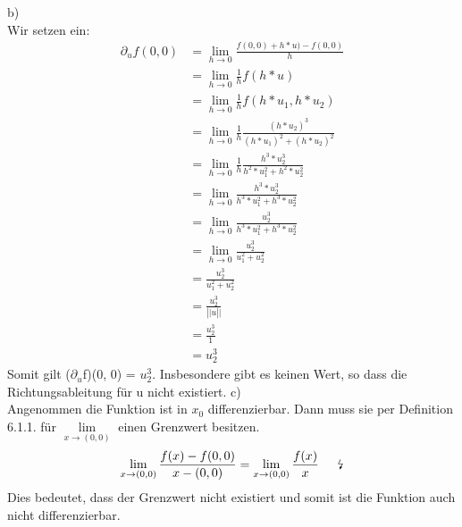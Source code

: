 \documentclass{article}
\begin{document}
\bigskip
\noindent b) \\ 
Wir setzen ein:
\begin{align*}
    \partial_u f(0, 0) &= \lim\limits_{h \to 0} \frac{f(0, 0) + h* u) - f(0, 0)}{h} \\ 
                       &= \lim\limits_{h \to 0} \frac{1}{h} f(h * u) \\ 
                       &= \lim\limits_{h \to 0} \frac{1}{h} f(h * u_1, h * u_2) \\ 
                        &= \lim\limits_{h \to 0} \frac{1}{h} \frac{(h * u_2)^3}{(h * u_1)^2 + (h * u_2)^2} \\ 
                        &= \lim\limits_{h \to 0} \frac{1}{h} \frac{h^3 * u_2^3}{h^2 * u_1^2 + h^2 * u_2^2} \\ 
                        &= \lim\limits_{h \to 0} \frac{h^3 * u_2^3}{h^3 * u_1^2 + h^3 * u_2^2} \\ 
                        &= \lim\limits_{h \to 0} \frac{u_2^3}{h^3 * u_1^2 + h^3 * u_2^2} \\ 
                        &= \lim\limits_{h \to 0} \frac{u_2^3}{u_1^2 + u_2^2} \\ 
                        &= \frac{u_2^3}{u_1^2 + u_2^2} \\ 
                        &= \frac{u_2^3}{\left|| u \right||} \\ 
                        &= \frac{u_2^3}{1} \\ 
                        &= u_2^3
 \end{align*}
 Somit gilt ($\partial_u$f)(0, 0) = $u_2^3$. Insbesondere gibt es keinen Wert, so dass 
 die Richtungsableitung für u nicht existiert. 
\bigskip 
\noindent c) \\ 
Angenommen die Funktion ist in $x_0$ differenzierbar. Dann muss sie per Definition 6.1.1.
für $\lim\limits_{x \to (0, 0)}$ einen Grenzwert besitzen.
\begin{align*}
     \lim\limits_{x \to (0, 0)} \frac{f(x) - f(0, 0)}{x - (0, 0)} =
 \lim\limits_{x \to (0, 0)} \frac{f(x)}{x} \indent  \text{\lightning}
 \end{align*}
Dies bedeutet, dass der Grenzwert nicht existiert und somit ist die 
Funktion auch nicht differenzierbar.

\bigskip
\end{document}
